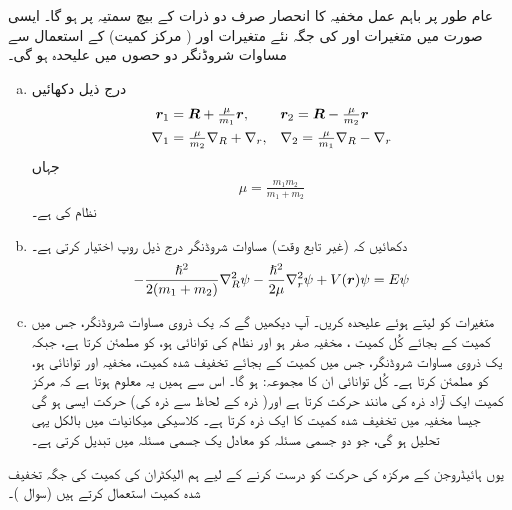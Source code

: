 عام طور پر باہم عمل مخفیہ کا انحصار صرف دو ذرات کے بیچ سمتیہ  پر ہو گا۔ ایسی صورت میں متغیرات  اور  کی جگہ نئے متغیرات  اور
( مرکز کمیت) کے استعمال سے مساوات شروڈنگر دو حصوں میں علیحدہ ہو گی۔ 
\begin{enumerate}[a.]
\item
درج ذیل دکھائیں
\begin{align*}
 {\ensuremath{{\boldsymbol{r}}}}_1 &= {{\boldsymbol{R}}} + \tfrac{ \mu}{m_1}{{\boldsymbol{r}}}, && {{\boldsymbol{r}}}_2 = {{\boldsymbol{R}}} - \tfrac{ \mu }{ m_2 } {{\boldsymbol{r}}}\\
 \nabla_1& = \tfrac{ \mu }{ m_2 }\nabla_R + \nabla_r , && \nabla_2 = \tfrac{ \mu }{ m_1 } \nabla_R - \nabla_r
\end{align*}
جہاں 
\begin{align}\label{مساوات_متماثل_تخفیف_شدہ_کمیت}
\mu = \frac{ m_1 m_2 }{ m_1 + m_2 }
\end{align}
نظام کی  ہے۔
\item 
 دکھائیں کہ (غیر تابع وقت) مساوات شروڈنگر درج ذیل روپ اختیار کرتی ہے۔
\begin{align*}
- \frac{ \hslash^2 }{ 2 ( m_1 + m_2 ) } \nabla_R^2 \psi - \frac{ \hslash^2 }{ 2 \mu }\nabla_r^2 { \psi } + V({{\boldsymbol{r}}}) \psi = E \psi
\end{align*}
\item
 متغیرات کو  لیتے ہوئے علیحدہ کریں۔ آپ دیکھیں گے کہ  یک ذروی مساوات شروڈنگر، جس میں کمیت  کے بجائے کُل کمیت ، مخفیہ صفر ہو اور نظام کی توانائی  ہو، کو مطمئن کرتا ہے، جبکہ  یک ذروی مساوات شروڈنگر، جس میں کمیت  کے بجائے تخفیف شدہ کمیت، مخفیہ  اور توانائی  ہو، کو مطمئن کرتا ہے۔ کُل توانائی ان کا مجموعہ:  ہو گا۔ اس سے ہمیں یہ معلوم ہوتا ہے کہ مرکز کمیت ایک آزاد ذرہ کی مانند حرکت کرتا ہے اور( ذرہ  کے لحاظ سے ذرہ  کی)  حرکت ایسی ہو گی جیسا مخفیہ  میں تخفیف شدہ کمیت کا ایک ذرہ کرتا ہے۔ کلاسیکی میکانیات میں بالکل یہی تحلیل ہو گی، جو دو جسمی مسئلہ کو معادل یک جسمی مسئلہ میں تبدیل کرتی ہے۔ 
\end{enumerate}
 یوں ہائیڈروجن کے مرکزہ کی حرکت کو درست کرنے کے لیے ہم الیکٹران کی کمیت کی جگہ تخفیف شدہ کمیت استعمال کرتے ہیں (سوال )۔ 
